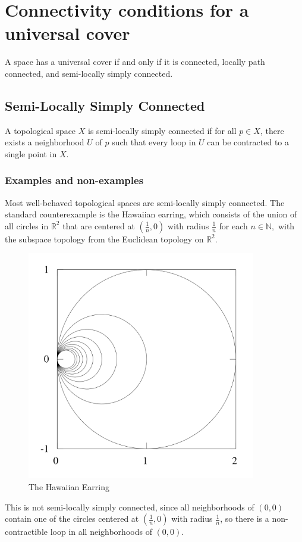 \documentclass{article}
\begin{document}
\section{Connectivity conditions for a universal cover}
A space has a universal cover if and only if it is connected, locally path connected, and semi-locally simply connected.
\subsection{Semi-Locally Simply Connected}
A topological space $X$ is semi-locally simply connected if for all $p\in X$, there exists a neighborhood $U$ of $p$ such that every loop in $U$ can be contracted to a single point in $X$.
\subsubsection{Examples and non-examples}
Most well-behaved topological spaces are semi-locally simply connected. The standard counterexample is the Hawaiian earring, which consists of the union of all circles in $\mathbb{R}^2$ that are centered at $(\frac{1}{n}, 0)$ with radius $\frac{1}{n}$ for each $n\in\mathbb{N},$ with the subspace topology from the Euclidean topology on $\mathbb{R}^2.$
\begin{figure}[H]
\centering
\includegraphics[width=10cm]{images/m4_earring.png}
\caption{\small{The Hawaiian Earring}}
\label{img:hawaiianearring}
\end{figure}
This is not semi-locally simply connected, since all neighborhoods of $(0, 0)$ contain one of the circles centered at $(\frac{1}{n}, 0)$ with radius $\frac{1}{n}$, so there is a non-contractible loop in all neighborhoods of $(0, 0).$
\end{document}

